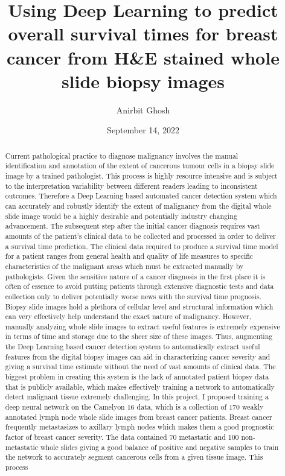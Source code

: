 \documentclass{l4proj}
\begin{document}
\title{Using Deep Learning to predict overall survival times for breast cancer from H\&E stained whole slide biopsy images}
\author{Anirbit Ghosh}
\date{September 14, 2022}

\maketitle

\begin{abstract}
    Current pathological practice to diagnose malignancy involves the manual identification and annotation of the extent of cancerous tumour cells in a biopsy slide image by a trained pathologist. This process is highly resource intensive and is subject to the interpretation variability between different readers leading to inconsistent outcomes. Therefore a Deep Learning based automated cancer detection system which can accurately and robustly identify the extent of malignancy from the digital whole slide image would be a highly desirable and potentially industry changing advancement. The subsequent step after the initial cancer diagnosis requires vast amounts of the patient's clinical data to be collected and processed in order to deliver a survival time prediction. The clinical data required to produce a survival time model for a patient ranges from general health and quality of life measures to specific characteristics of the malignant areas which must be extracted manually by pathologists. Given the sensitive nature of a cancer diagnosis in the first place it is often of essence to avoid putting patients through extensive diagnostic tests and data collection only to deliver potentially worse news with the survival time prognosis. Biopsy slide images hold a plethora of cellular level and structural information which can very effectively help understand the exact nature of malignancy. However, manually analyzing whole slide images to extract useful features is extremely expensive in terms of time and storage due to the sheer size of these images. Thus, augmenting the Deep Learning based cancer detection system to automatically extract useful features from the digital biopsy images can aid in characterizing cancer severity and giving a survival time estimate without the need of vast amounts of clinical data. The biggest problem in creating this system is the lack of annotated patient biopsy data that is publicly available, which makes effectively training a network to automatically detect malignant tissue extremely challenging. In this project, I proposed training a deep neural network on the Camelyon 16 data, which is a collection of 170 weakly annotated lymph node whole slide images from breast cancer patients. Breast cancer frequently metastasizes to axillary lymph nodes which makes them a good prognostic factor of breast cancer severity. The data contained 70 metastatic and 100 non-metastatic whole slides giving a good balance of positive and negative samples to train the network to accurately segment cancerous cells from a given tissue image. This process 
\end{abstract}
\end{document}
